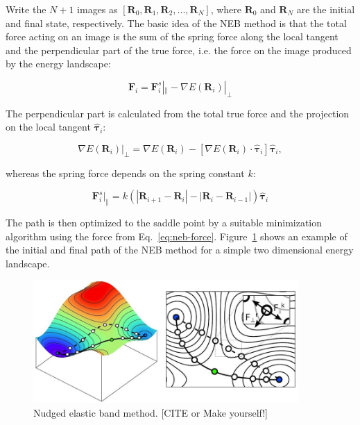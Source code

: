 \begin{refsection}
Write the $N + 1$ images as $\left[ \mathbf{R}_0,  \mathbf{R}_1,  \mathbf{R}_2, ...,  \mathbf{R}_N  \right]$, where $ \mathbf{R}_0$ and $ \mathbf{R}_N$ are the initial and final state, respectively. The basic idea of the NEB method is that the total force acting on an image is the sum of the spring force along the local tangent and the perpendicular part of the true force, i.e. the force on the image produced by the energy landscape:

\begin{equation}\label{eq:neb-force}
\mathbf{F}_i = \mathbf{F}_i^s|_\parallel - \nabla E(\mathbf{R}_i)|_\perp
\end{equation}

The perpendicular part is calculated from the total true force and the projection on the local tangent $\boldsymbol{\hat{\tau}}_i$:

\begin{equation}
\nabla E(\mathbf{R}_i)|_\perp = \nabla E(\mathbf{R}_i) - \left[ \nabla E(\mathbf{R}_i) \cdot \boldsymbol{\hat{\tau}}_i \right] \boldsymbol{\hat{\tau}}_i ,
\end{equation}

whereas the spring force depends on the spring constant $k$:

\begin{equation}\label{eq:neb-spring}
\mathbf{F}_i^s|_\parallel = k\left( |\mathbf{R}_{i+1} - \mathbf{R}_i | - |\mathbf{R}_i - \mathbf{R}_{i-1} | \right) \boldsymbol{\hat{\tau}}_i
\end{equation}

The path is then optimized to the saddle point by a suitable minimization algorithm using the force from Eq.~\ref{eq:neb-force}. Figure~\ref{fig:neb} shows an example of the initial and final path of the NEB method for a simple two dimensional energy landscape. 

\begin{figure}[h]
\includegraphics[width=0.9\textwidth]{figures/DFT/neb.jpg}
\caption{\label{fig:neb} Nudged elastic band method. [CITE or Make yourself!]}
\end{figure}


\end{refsection}
